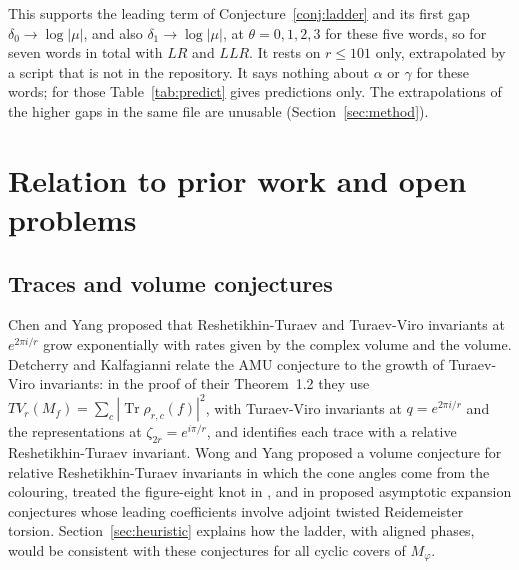 \documentclass[11pt]{amsart}
\theoremstyle{definition}
\theoremstyle{remark}
\newcommand{\Tr}{\operatorname{Tr}}
\begin{document}
This supports the leading term of Conjecture~\ref{conj:ladder} and its first gap
$\delta_0 \to \log|\mu|$, and also $\delta_1 \to \log|\mu|$, at
$\theta = 0, 1, 2, 3$ for these five words, so for seven words in total with $LR$ and
$LLR$. It rests on $r \le 101$ only, extrapolated by a script that is not in the
repository. It says nothing about $\alpha$ or $\gamma$ for these words; for those
Table~\ref{tab:predict} gives predictions only. The extrapolations of the higher gaps
in the same file are unusable (Section~\ref{sec:method}).

\section{Relation to prior work and open problems}\label{sec:prior}

\subsection{Traces and volume conjectures}
Chen and Yang \cite{CY} proposed that Reshetikhin-Turaev and Turaev-Viro invariants
at $e^{2\pi i/r}$ grow exponentially with rates given by the complex volume and the
volume. Detcherry and Kalfagianni \cite{DK} relate the AMU conjecture to the growth of
Turaev-Viro invariants: in the proof of their Theorem~1.2 they use
$TV_r(M_f) = \sum_c |\Tr\rho_{r,c}(f)|^2$, with Turaev-Viro invariants at
$q = e^{2\pi i/r}$ and the representations at $\zeta_{2r} = e^{i\pi/r}$, and
\cite[Thm.~2.3]{DK} identifies each trace with a relative Reshetikhin-Turaev
invariant. Wong and Yang \cite{WY1} proposed a volume conjecture for relative
Reshetikhin-Turaev invariants in which the cone angles come from the colouring,
treated the figure-eight knot in \cite{WY1b}, and in \cite{WY2} proposed asymptotic expansion conjectures whose leading coefficients
involve adjoint twisted Reidemeister torsion. Section~\ref{sec:heuristic} explains
how the ladder, with aligned phases, would be consistent with these conjectures for
all cyclic covers of $M_\varphi$.
\end{document}
